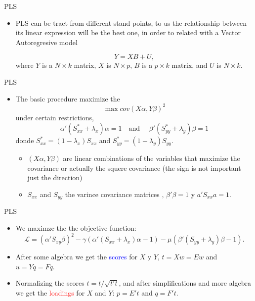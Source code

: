 \documentclass{beamer}
\newcommand{\?}{?`}
\begin{document}
\begin{frame}{PLS}
  \begin{itemize}
  \item PLS can be tract from different stand points, to us the relationship between its linear expression  will be the best one, in order to related with a Vector Autoregresive model   
   \bigskip
  
   \begin{displaymath}
      Y=XB+U,
    \end{displaymath}
    \bigskip
    where $Y$ is a $N\times k$ matrix, $X$ is $N\times p$, $B$ is a
     $p\times k$ matrix, and  $U$ is  $N\times k$.


  \end{itemize}
\end{frame}


 
\begin{frame}{PLS}
  \begin{itemize}
  \item The basic procedure maximize the  
    \begin{displaymath}
      \max cov(X\alpha,Y\beta)^2
    \end{displaymath}
    under certain restrictions,
    \begin{displaymath}
      \alpha'(S_{xx}^{*}+\lambda_x)\alpha = 1 \quad \text{and } \quad
      \beta'(S_{yy}^{*}+\lambda_y)\beta = 1 
    \end{displaymath}
    donde $S_{xx}^{*}=(1-\lambda_x)S_{xx}$ and
    $S_{yy}^{*}=(1-\lambda_y)S_{yy}$.
    \begin{itemize}
    \item $(X\alpha,Y\beta)$ are linear combinations of the variables that  maximize the covariance or actually the squere covariance (the sign is not important just the direction)
    \item $S_{xx}$ and $S_{yy}$ the varince covariance matrices
      , $\beta'\beta=1$ y $a'S_{xx}a=1$.
    \end{itemize}
  \end{itemize}
\end{frame}
 
\begin{frame}{PLS}
  \begin{itemize}
  \item We maximze the the objective function:
    \begin{displaymath}
      \mathcal{L}=
      (\alpha'S_{xy}\beta)^2-\gamma(\alpha'(S_{xx}+\lambda_x)\alpha-1)
      - \mu(\beta'(S_{yy}+\lambda_y)\beta-1).
    \end{displaymath}
  \item After some algebra we get the {\textcolor{blue}{scores}} for  $X$ y
    $Y$, $t=Xw=Ew$ and $u=Yq=Fq$.
  \item  Normalizing the scores   $t=t/\sqrt{t't}$, and after simplifications and more algebra we get the \textcolor{red}{loadings} for  $X$ and $Y$: $p=E't$
   and $q=F't$.
  \end{itemize}
\end{frame}
 
\end{document}
